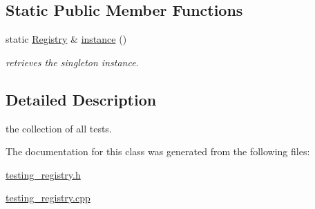 \subsection*{Static Public Member Functions}
\begin{DoxyCompactItemize}
\item 
\hypertarget{classhryky_1_1testing_1_1_registry_adf6d2875f479e3b523a0ceab5434319f}{static \hyperlink{classhryky_1_1testing_1_1_registry}{Registry} \& \hyperlink{classhryky_1_1testing_1_1_registry_adf6d2875f479e3b523a0ceab5434319f}{instance} ()}\label{classhryky_1_1testing_1_1_registry_adf6d2875f479e3b523a0ceab5434319f}

\begin{DoxyCompactList}\small\item\em retrieves the singleton instance. \end{DoxyCompactList}\end{DoxyCompactItemize}


\subsection{Detailed Description}
the collection of all tests. 

The documentation for this class was generated from the following files\-:\begin{DoxyCompactItemize}
\item 
\hyperlink{testing__registry_8h}{testing\-\_\-registry.\-h}\item 
\hyperlink{testing__registry_8cpp}{testing\-\_\-registry.\-cpp}\end{DoxyCompactItemize}
